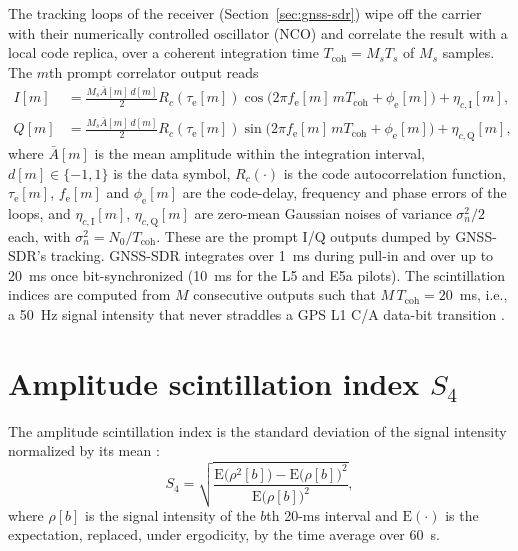 \documentclass{article}
\begin{document}
The tracking loops of the receiver (Section~\ref{sec:gnss-sdr}) wipe off the carrier with their numerically controlled oscillator (NCO) and correlate the result with a local code replica, over a coherent integration time $T_\mathrm{coh} = M_s T_s$ of $M_s$ samples. The $m$th prompt correlator output reads \cite{wendlerScintillationProcessingSoftware2016}
\begin{align}
  I[m] &= \frac{M_s \bar A[m]\, d[m]}{2} R_c(\tau_\mathrm{e}[m]) \operatorname{cos}\big(2\pi f_\mathrm{e}[m]\, m T_\mathrm{coh} + \phi_\mathrm{e}[m]\big) + \eta_{c,\mathrm{I}}[m], \label{eq:prompt-i}\\
  Q[m] &= \frac{M_s \bar A[m]\, d[m]}{2} R_c(\tau_\mathrm{e}[m]) \operatorname{sin}\big(2\pi f_\mathrm{e}[m]\, m T_\mathrm{coh} + \phi_\mathrm{e}[m]\big) + \eta_{c,\mathrm{Q}}[m], \label{eq:prompt-q}
\end{align}
where $\bar A[m]$ is the mean amplitude within the integration interval, $d[m] \in \{-1, 1\}$ is the data symbol, $R_c(\cdot)$ is the code autocorrelation function, $\tau_\mathrm{e}[m]$, $f_\mathrm{e}[m]$ and $\phi_\mathrm{e}[m]$ are the code-delay, frequency and phase errors of the loops, and $\eta_{c,\mathrm{I}}[m]$, $\eta_{c,\mathrm{Q}}[m]$ are zero-mean Gaussian noises of variance $\sigma_n^2/2$ each, with $\sigma_n^2 = N_0/T_\mathrm{coh}$. These are the prompt I/Q outputs dumped by GNSS-SDR's tracking. GNSS-SDR integrates over 1~ms during pull-in and over up to 20~ms once bit-synchronized (10~ms for the L5 and E5a pilots). The scintillation indices are computed from $M$ consecutive outputs such that $M\,T_\mathrm{coh} = 20$~ms, i.e., a 50~Hz signal intensity that never straddles a GPS L1 C/A data-bit transition \cite{lopesLinearTimeinvariantFiltering2023}.

\section{Amplitude scintillation index \texorpdfstring{$S_4$}{S4}}
\label{sec:s4}

The amplitude scintillation index is the standard deviation of the signal intensity normalized by its mean \cite{briggsVariationRadioStar1963}:
\begin{equation}
  \label{eq:s4-definition}
  S_4 = \sqrt{\frac{\mathrm{E}\big(\rho^2[b]\big) - \mathrm{E}\big(\rho[b]\big)^2}{\mathrm{E}\big(\rho[b]\big)^2}},
\end{equation}
where $\rho[b]$ is the signal intensity of the $b$th 20-ms interval and $\mathrm{E}(\cdot)$ is the expectation, replaced, under ergodicity, by the time average over 60~s.
\end{document}
